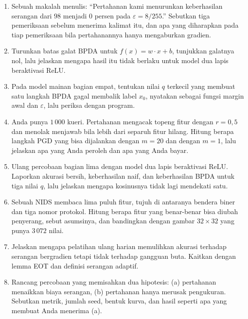 \begin{latihan}
\begin{enumerate}
  \item Sebuah makalah menulis: ``Pertahanan kami menurunkan keberhasilan serangan dari
        $98$ menjadi $0$ persen pada $\varepsilon=8/255$.'' Sebutkan tiga pemeriksaan
        sebelum menerima kalimat itu, dan apa yang diharapkan pada tiap pemeriksaan bila
        pertahanannya hanya mengaburkan gradien.
  \item Turunkan batas galat BPDA untuk $f(x)=w\cdot x+b$, tunjukkan galatnya nol, lalu
        jelaskan mengapa hasil itu tidak berlaku untuk model dua lapis beraktivasi ReLU.
  \item Pada model mainan bagian empat, tentukan nilai $q$ terkecil yang membuat satu
        langkah BPDA gagal membalik label $x_0$, nyatakan sebagai fungsi margin awal dan
        $\varepsilon$, lalu periksa dengan program.
  \item Anda punya $1\,000$ kueri. Pertahanan mengacak topeng fitur dengan $r=0{,}5$ dan
        menolak menjawab bila lebih dari separuh fitur hilang. Hitung berapa langkah PGD
        yang bisa dijalankan dengan $m=20$ dan dengan $m=1$, lalu jelaskan apa yang Anda
        peroleh dan apa yang Anda bayar.
  \item Ulang percobaan bagian lima dengan model dua lapis beraktivasi ReLU. Laporkan
        akurasi bersih, keberhasilan naif, dan keberhasilan BPDA untuk tiga nilai $q$,
        lalu jelaskan mengapa kosinusnya tidak lagi mendekati satu.
  \item Sebuah NIDS membaca lima puluh fitur, tujuh di antaranya bendera biner dan tiga
        nomor protokol. Hitung berapa fitur yang benar-benar bisa diubah penyerang, sebut
        asumsinya, dan bandingkan dengan gambar $32\times32$ yang punya $3\,072$ nilai.
  \item Jelaskan mengapa pelatihan ulang harian memulihkan akurasi terhadap serangan
        bergradien tetapi tidak terhadap gangguan buta. Kaitkan dengan lemma EOT dan
        definisi serangan adaptif.
  \item Rancang percobaan yang memisahkan dua hipotesis: (a) pertahanan menaikkan biaya
        serangan, (b) pertahanan hanya merusak pengukuran. Sebutkan metrik, jumlah seed,
        bentuk kurva, dan hasil seperti apa yang membuat Anda menerima (a).
\end{enumerate}
\end{latihan}

